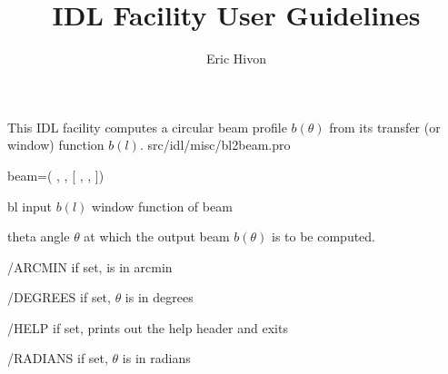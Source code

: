 

\sloppy

\title{\healpix IDL Facility User Guidelines}
 \section[bl2beam]{ }
\label{idl:bl2beam}
\author{Eric Hivon}

\begin{facility}
{This IDL facility computes a circular beam profile $b(\theta)$ from its transfer (or window) function $b(l)$.
}
{src/idl/misc/bl2beam.pro}
\end{facility}

\begin{IDLformat}
{%
{beam}=\thedocid(
, 
, %
[%
 ,
, 
%
])}
\end{IDLformat}

\begin{qualifiers}
  \begin{qulist}{} %
    \item[bl] %
      input $b(l)$ window function of beam
    \item[theta] %
    angle $\theta$ at which the output beam $b(\theta)$ is to be computed.
  \end{qulist}
\end{qualifiers}

\begin{keywords}
  \begin{kwlist}{} %
    \item[/ARCMIN] %
	if set,  is in arcmin
    \item[/DEGREES] %
	if set, $\theta$ is in degrees
    \item[/HELP] %
	if set, prints out the help header and exits
    \item[/RADIANS] %
	if set, $\theta$ is in radians
  \end{kwlist}
\end{keywords}  

